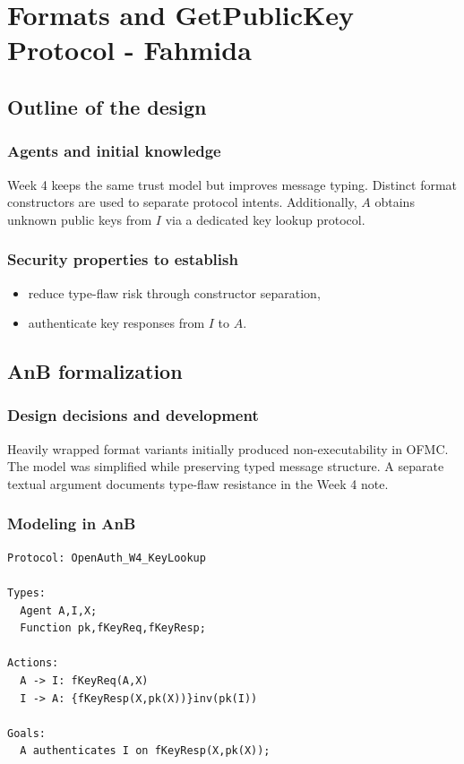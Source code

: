 \documentclass[11pt,a4paper]{article}
\begin{document}
\newpage
\section{Formats and GetPublicKey Protocol - Fahmida}

\subsection{Outline of the design}

\subsubsection{Agents and initial knowledge}
Week 4 keeps the same trust model but improves message typing.
Distinct format constructors are used to separate protocol intents.
Additionally, $A$ obtains unknown public keys from $I$ via a dedicated key lookup protocol.

\subsubsection{Security properties to establish}
\begin{itemize}
  \item reduce type-flaw risk through constructor separation,
  \item authenticate key responses from $I$ to $A$.
\end{itemize}

\subsection{AnB formalization}

\subsubsection{Design decisions and development}
Heavily wrapped format variants initially produced non-executability in OFMC.
The model was simplified while preserving typed message structure.
A separate textual argument documents type-flaw resistance in the Week 4 note.

\subsubsection{Modeling in AnB}
\begin{lstlisting}
Protocol: OpenAuth_W4_KeyLookup

Types:
  Agent A,I,X;
  Function pk,fKeyReq,fKeyResp;

Actions:
  A -> I: fKeyReq(A,X)
  I -> A: {fKeyResp(X,pk(X))}inv(pk(I))

Goals:
  A authenticates I on fKeyResp(X,pk(X));
\end{lstlisting}
\end{document}
